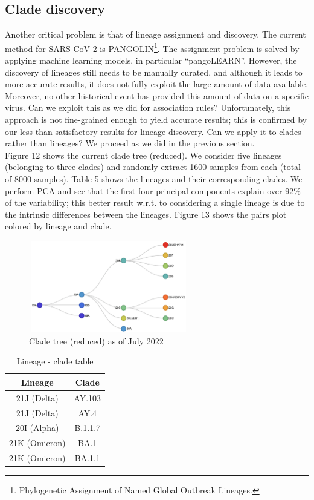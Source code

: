 \documentclass[twoside,twocolumn]{article}
\begin{document}
\subsection{Clade discovery}
Another critical problem is that of lineage assignment and discovery. The current method for SARS-CoV-2 is PANGOLIN\footnote{Phylogenetic Assignment of Named Global Outbreak Lineages.}\cite{pango}. The assignment problem is solved by applying machine learning models, in particular \textquotedblleft pangoLEARN\textquotedblright\cite{pangolearn}. However, the discovery of lineages still needs to be manually curated, and although it leads to more accurate results, it does not fully exploit the large amount of data available. Moreover, no other historical event has provided this amount of data on a specific virus. Can we exploit this as we did for association rules? Unfortunately, this approach is not fine-grained enough to yield accurate results; this is confirmed by our less than satisfactory results for lineage discovery. Can we apply it to clades rather than lineages? We proceed as we did in the previous section.
\\Figure 12 shows the current clade tree (reduced). We consider five lineages (belonging to three clades) and randomly extract 1600 samples from each (total of 8000 samples). Table 5 shows the lineages and their corresponding clades. We perform PCA and see that the first four principal components explain over 92\% of the variability; this better result w.r.t. to considering a single lineage is due to the intrinsic differences between the lineages. Figure 13 shows the pairs plot colored by lineage and clade.
\begin{figure}[h]
	\caption{Clade tree (reduced) as of July 2022}
	\label{clades}
	\centering
	\includegraphics[width=70mm, height=40mm]{clades.png}
\end{figure}
\begin{table}
	\caption{Lineage - clade table}
	\centering
	\renewcommand{\tabcolsep}{2pc} %
	\renewcommand{\arraystretch}{1.2} %
	\begin{tabular}{| c | c |}
		\hline
		Lineage & Clade \\
		\hline
		21J (Delta) & AY.103 \\
		21J (Delta) & AY.4 \\
		20I (Alpha) & B.1.1.7 \\
		21K (Omicron) & BA.1 \\
		21K (Omicron) & BA.1.1 \\
		\hline
	\end{tabular}
\end{table}
\end{document}
